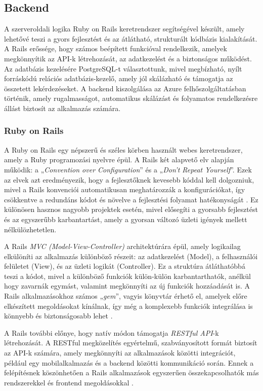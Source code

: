 \subsection{Backend}

A szerveroldali logika Ruby on Rails keretrendszer segítségével készült, amely lehetővé teszi a gyors fejlesztést és az átlátható, strukturált kódbázis kialakítását. A Rails erőssége, hogy számos beépített funkcióval rendelkezik, amelyek megkönnyítik az API-k létrehozását, az adatkezelést és a biztonságos működést. Az adatbázis kezelésére PostgreSQL-t választottunk, mivel megbízható, nyílt forráskódú relációs adatbázis-kezelő, amely jól skálázható és támogatja az összetett lekérdezéseket. A backend kiszolgálása az Azure felhőszolgáltatásban történik, amely rugalmasságot, automatikus skálázást és folyamatos rendelkezésre állást biztosít az alkalmazás számára.

\subsubsection{Ruby on Rails}
A Ruby on Rails egy népszerű és széles körben használt webes keretrendszer, amely a Ruby programozási nyelvre épül. A Rails két alapvető elv alapján működik: a „\textit{Convention over Configuration}” és a „\textit{Don’t Repeat Yourself}”. Ezek az elvek azt eredményezik, hogy a fejlesztőknek kevesebb kóddal kell dolgozniuk, mivel a Rails konvenciói automatikusan meghatározzák a konfigurációkat, így csökkentve a redundáns kódot és növelve a fejlesztési folyamat hatékonyságát \cite{hartl_rails, fernandez_rails}. Ez különösen hasznos nagyobb projektek esetén, mivel elősegíti a gyorsabb fejlesztést és az egyszerűbb karbantartást, amely a gyorsan változó üzleti igények mellett nélkülözhetetlen.

A Rails \textit{MVC (Model-View-Controller)} architektúrára épül, amely logikailag elkülöníti az alkalmazás különböző részeit: az adatkezelést (Model), a felhasználói felületet (View), és az üzleti logikát (Controller). Ez a struktúra átláthatóbbá teszi a kódot, mivel a különböző funkciók külön-külön karbantarthatók, anélkül hogy zavarnák egymást, valamint megkönnyíti az új funkciók hozzáadását is. A Rails alkalmazásokhoz számos „\textit{gem}”, vagyis könyvtár érhető el, amelyek előre elkészített megoldásokat kínálnak, így még a komplexebb funkciók integrálása is könnyebb és biztonságosabb lehet \cite{hartl_rails}.

A Rails további előnye, hogy natív módon támogatja \textit{RESTful API}-k létrehozását. A RESTful megközelítés egyértelmű, szabványosított formát biztosít az API-k számára, amely megkönnyíti az alkalmazások közötti integrációt, például egy mobilalkalmazás és a backend közötti kommunikáció során. Ennek a felépítésnek köszönhetően a Rails alkalmazások egyszerűen összekapcsolhatók más rendszerekkel és frontend megoldásokkal \cite{fernandez_rails}.

